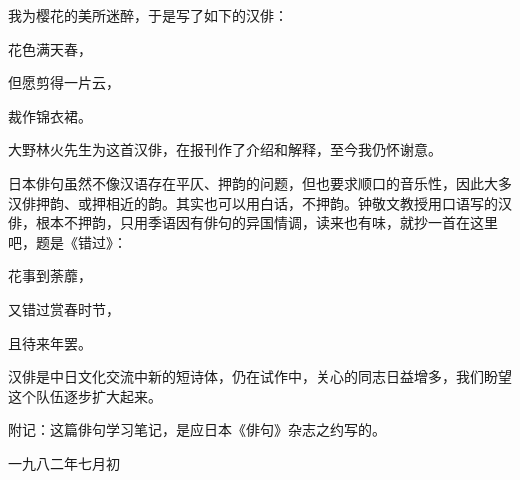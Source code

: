 {    我为樱花的美所迷醉，于是写了如下的汉俳：

    \begin{center}
        花色满天春，

        但愿剪得一片云，

        裁作锦衣裙。
    \end{center}

    大野林火先生为这首汉俳，在报刊作了介绍和解释，至今我仍怀谢意。

    日本俳句虽然不像汉语存在平仄、押韵的问题，但也要求顺口的音乐性，因此大多汉俳押韵、或押相近的韵。其实也可以用白话，不押韵。钟敬文教授用口语写的汉俳，根本不押韵，只用季语因有俳句的异国情调，读来也有味，就抄一首在这里吧，题是《错过》：

    \begin{center}
        花事到荼蘼，

        又错过赏春时节，

        且待来年罢。
    \end{center}

    汉俳是中日文化交流中新的短诗体，仍在试作中，关心的同志日益增多，我们盼望这个队伍逐步扩大起来。

    \bigskip

    附记：这篇俳句学习笔记，是应日本《俳句》杂志之约写的。

    \hfill 一九八二年七月初
}
